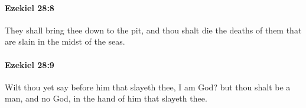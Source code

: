 		\paragraph{Ezekiel 28:8} %
			\label{EZEKIEL-28-8}

			They shall bring thee down to the pit, and thou shalt die the deaths of them that are slain in the midst of the seas.


		\paragraph{Ezekiel 28:9} %
			\label{EZEKIEL-28-9}

			Wilt thou yet say before him that slayeth thee, I am God? but thou shalt be a man, and no God, in the hand of him that slayeth thee.


